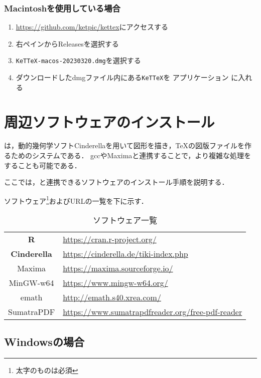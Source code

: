 \subsubsection{Macintoshを使用している場合}
\begin{enumerate}
    \item \url{https://github.com/ketpic/kettex}にアクセスする
    \item 右ペインからReleasesを選択する
    \item \verb|KeTTeX-macos-20230320.dmg|を選択する
    \item ダウンロードしたdmgファイル内にある\verb|KeTTeX|を アプリケーション に入れる
\end{enumerate}

\newpage

\section{周辺ソフトウェアのインストール}

{\ketcindy}は，動的幾何学ソフトCinderellaを用いて図形を描き，{\TeX}の図版ファイルを作るためのシステムである．
gccやMaximaと連携することで，より複雑な処理をすることも可能である．

ここでは，{\ketcindy}と連携できるソフトウェアのインストール手順を説明する．

ソフトウェア\footnote{太字のものは必須}およびURLの一覧を下に示す．

\begin{table}[h]
    \centering
    \caption{ソフトウェア一覧}
    \label{tab:download}
    \begin{tabular}{c||l}
        \textbf{R}           & \url{https://cran.r-project.org/}\\
        \textbf{Cinderella}  & \url{https://cinderella.de/tiki-index.php}\\
        Maxima      & \url{https://maxima.sourceforge.io/}\\
        MinGW-w64   & \url{https://www.mingw-w64.org/}\\
        emath       & \url{http://emath.s40.xrea.com/}\\
        SumatraPDF  & \url{https://www.sumatrapdfreader.org/free-pdf-reader}
    \end{tabular}
\end{table}

\subsection{Windowsの場合}

